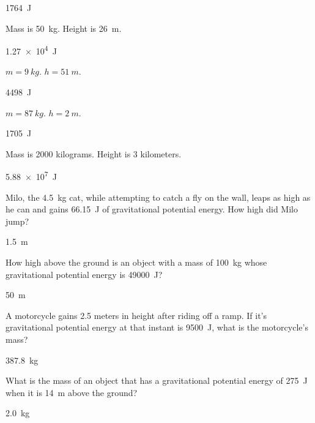 \documentclass[../main-physics-problems.tex]{subfiles}
\begin{document}
\begin{questions}
\begin{solution}
\SI{1764}{J}
\end{solution}


\question \label{NS8TFJ}
Mass is \SI{50}{kg}. Height is \SI{26}{m}.

\begin{solution}
\SI{1.27e4}{J}
\end{solution}


\question \label{29XPZj}
$m = \SI{9}{kg}$. $h = \SI{51}{m}$.

\begin{solution}
\SI{4498}{J}
\end{solution}


\question \label{Fv0opf}
$m = \SI{87}{kg}$. $h = \SI{2}{m}$.

\begin{solution}
\SI{1705}{J}
\end{solution}


\question \label{Y0v7pI}
Mass is 2000 kilograms. Height is 3 kilometers.

\begin{solution}
\SI{5.88e7}{J}
\end{solution}


\question \label{CdBjWD}
Milo, the \SI{4.5}{kg} cat, while attempting to catch a fly on the wall, leaps as high as he can and gains \SI{66.15}{J} of gravitational potential energy. How high did Milo jump?

\begin{solution}
\SI{1.5}{m}
\end{solution}


\question \label{M8oc7x}
How high above the ground is an object with a mass of \SI{100}{kg} whose gravitational potential energy is \SI{49000}{J}?

\begin{solution}
\SI{50}{m}
\end{solution}

\question \label{4S3f3k}
A motorcycle gains 2.5 meters in height after riding off a ramp. If it's gravitational potential energy at that instant is \SI{9500}{J}, what is the motorcycle's mass?

\begin{solution}
\SI{387.8}{kg}
\end{solution}

\question \label{JangCo}
What is the mass of an object that has a gravitational potential energy of \SI{275}{J} when it is \SI{14}{m} above the ground?

\begin{solution}
\SI{2.0}{kg}
\end{solution}




\end{questions}
\end{document}
